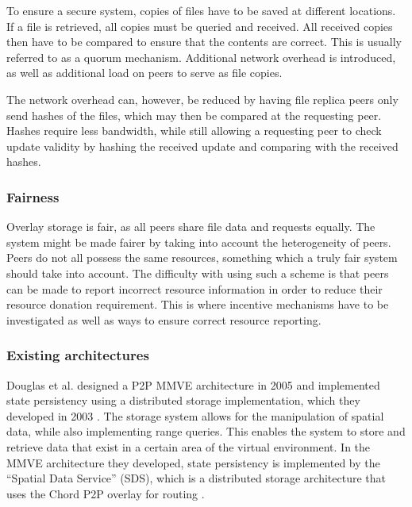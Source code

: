 To ensure a secure system, copies of files have to be saved at different locations. If a file is retrieved, all copies must be queried and received. All received copies then have to be compared to ensure that the contents are correct. This is usually referred to as a quorum mechanism.  Additional network overhead is introduced, as well as additional load on peers to serve as file copies.

The network overhead can, however, be reduced by having file replica peers only send hashes of the files, which may then be compared at the requesting peer. Hashes require less bandwidth, while still allowing a requesting peer to check update validity by hashing the received update and comparing with the received hashes.

\subsubsection{Fairness}

Overlay storage is fair, as all peers share file data and requests equally. The system might be made fairer by taking into account the heterogeneity of peers. Peers do not all possess the same resources, something which a truly fair system should take into account. The difficulty with using such a scheme is that peers can be made to report incorrect resource information in order to reduce their resource donation requirement. This is where incentive mechanisms have to be investigated as well as ways to ensure correct resource reporting.

\subsubsection{Existing architectures}

Douglas et al. designed a P2P MMVE architecture in 2005 \cite{Douglas05enablingmassively} and implemented state persistency using a distributed storage implementation, which they developed in 2003 \cite{Harwood03hashingspatial}. The storage system allows for the manipulation of spatial data, while also implementing range queries. This enables the system to store and retrieve data that exist in a certain area of the virtual environment. In the MMVE architecture they developed, state persistency is implemented by the ``Spatial Data Service'' (SDS), which is a distributed storage architecture that uses the Chord P2P overlay for routing \cite{chord}.

